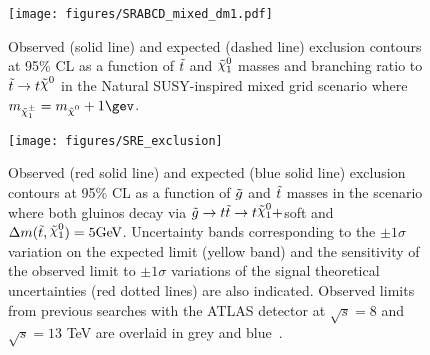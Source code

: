 \begin{figure}[h]
  \begin{center}
    \texttt{[image: figures/SRABCD\_mixed\_dm1.pdf]}
    \caption[Exclusion contours for the Natural SUSY-inspired mixed grid scenario]{Observed (solid line) and expected (dashed line) exclusion contours at 95\% CL as a function of $\tilde{t}$ and $\ninoone$ masses and branching ratio to $\stop\to t\LSP$ in the Natural SUSY-inspired mixed grid scenario where $m_{\chinoonepm}=\mLSP+1\gev$. %
}
    \label{fig:tbMet_exclusion}
  \end{center}
\end{figure}


\begin{figure}[h]
  \begin{center}
    \texttt{[image: figures/SRE\_exclusion]}
    \caption[Exclusion controus for the scenario where both
      gluinos decay via $\gluino\to t\stop\to t\ninoone$]{Observed (red solid line) and expected (blue solid line)
      exclusion contours at 95\% CL as a function
      of $\tilde{g}$ and $\tilde{t}$ masses in the scenario where both
      gluinos decay via $\gluino\to t\stop\to t\ninoone+$soft
      and $\Delta m(\stop,\ninoone)=5\GeV$. Uncertainty bands corresponding to the $\pm 1
      \sigma$ variation on the expected limit (yellow band) and the
      sensitivity of the observed limit to $\pm 1\sigma$ variations of
      the signal theoretical uncertainties (red dotted lines) are also
      indicated. Observed limits from previous searches with the ATLAS detector at $\sqrt{s}=8$ and $\sqrt{s}=13$ TeV are overlaid in grey and blue~\cite{GtcStop1L,Gtc1L,GtcMonojet}.}
    \label{fig:SRE_exclusion}
  \end{center}
\end{figure}
\clearpage

%



